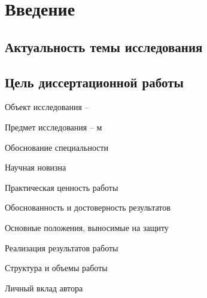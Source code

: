 \section*{Введение}

\subsection*{Актуальность темы исследования}

\subsection*{Цель диссертационной работы}


Объект исследования –

Предмет исследования – м

Обоснование специальности

Научная новизна

Практическая ценность работы

Обоснованность и достоверность результатов

Основные положения, выносимые на защиту

Реализация результатов работы

Структура и объемы работы

Личный вклад автора

